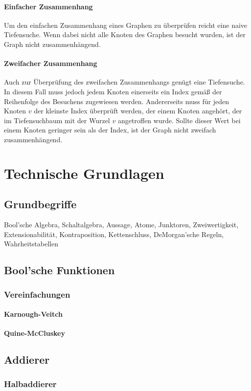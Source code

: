 \documentclass{article}
\begin{document}
\paragraph{Einfacher Zusammenhang}
Um den einfachen Zusammenhang eines Graphen zu überprüfen reicht eine naive Tiefensuche. Wenn dabei nicht alle Knoten des Graphen besucht wurden, ist der Graph nicht zusammenhängend.
\paragraph{Zweifacher Zusammenhang}
Auch zur Überprüfung des zweifachen Zusammenhangs genügt eine Tiefensuche. In diesem Fall muss jedoch jedem Knoten einerseits ein Index gemäß der Reihenfolge des Besuchens zugewiesen werden. Andererseits muss für jeden Knoten $v$ der kleinste Index überprüft werden, der einem Knoten angehört, der im Tiefensuchbaum mit der Wurzel $v$ angetroffen wurde. Sollte dieser Wert bei einem Knoten geringer sein als der Index, ist der Graph nicht zweifach zusammenhängend.
\section{Technische Grundlagen}
\subsection{Grundbegriffe}
Bool'sche Algebra, Schaltalgebra, Aussage, Atome, Junktoren, Zweiwertigkeit, Extensionabilität, Kontraposition, Kettenschluss, DeMorgan'sche Regeln, Wahrheitstabellen
\subsection{Bool'sche Funktionen}
\subsubsection{Vereinfachungen}
\paragraph{Karnough-Veitch}
\paragraph{Quine-McCluskey}
\subsection{Addierer}
\subsubsection{Halbaddierer}
\end{document}
